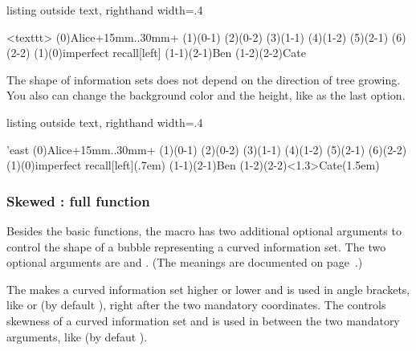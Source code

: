 \begin{tcblisting}{listing outside text, righthand width=.4\linewidth}
\begin{istgame}
<texttt>
\istroot(0){Alice}+15mm..30mm+
                  \istb \istb \endist
\istroot(1)(0-1)  \istb \istb \endist
\istroot(2)(0-2)  \istb \istb \endist
\xtdistance{10mm}{10mm}
\istroot(3)(1-1)  \istb \istb \endist
\istroot(4)(1-2)  \istb \istb \endist
\istroot(5)(2-1)  \istb \istb \endist
\istroot(6)(2-2)  \istb \istb \endist
\xtCInfosetO*(1)(0){imperfect recall}[left]
\xtCInfosetO(1-1)(2-1){Ben}
\xtCInfosetO(1-2)(2-2){Cate}
\end{istgame}
\end{tcblisting}

The shape of information sets does not depend on the direction of tree growing.
You also can change the background color and the height, like \xw{(1.5em)} as the last option.

\begin{tcblisting}{listing outside text, righthand width=.4\linewidth}
\begin{istgame}[font=\scriptsize]
\setistgrowdirection'{east}
\istroot(0){Alice}+15mm..30mm+
                  \istb \istb \endist
\istroot(1)(0-1)  \istb \istb \endist
\istroot(2)(0-2)  \istb \istb \endist
\xtdistance{10mm}{10mm}
\istroot(3)(1-1)  \istb \istb \endist
\istroot(4)(1-2)  \istb \istb \endist
\istroot(5)(2-1)  \istb \istb \endist
\istroot(6)(2-2)  \istb \istb \endist
\xtCInfosetO[fill=blue!20]
   (1)(0){imperfect recall}[left](.7em)
\xtCInfosetO[fill=blue!20]
   (1-1)(2-1){Ben}
\xtCInfosetO[fill=red!40,opacity=.5]
   (1-2)(2-2)<1.3>{Cate}(1.5em)
\end{istgame}
\end{tcblisting}


\subsubsection{Skewed \protect\cmd{\xtCInfosetO}: full function}

Besides the basic functions, the macro \icmd{\xtCInfosetO} has two additional optional arguments to control the shape of a bubble representing a curved information set.
The two optional arguments are  and . (The meanings are documented on page~\pageref{page:plotfactor}.)

The  makes a curved information set higher or lower and is used in angle brackets, like  or  (by default ), right after the two mandatory coordinates. The  controls skewness of a curved information set and is used in between the two mandatory arguments, like  (by defaut ). 

